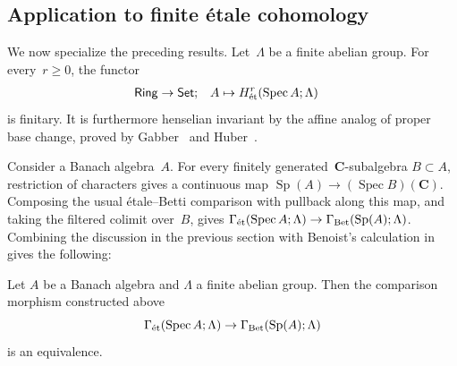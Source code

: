 \documentclass[11pt,a4paper]{amsart}
\numberwithin{equation}{section}
\theoremstyle{plain}
\theoremstyle{definition}
\theoremstyle{remark}
\newcommand{\CC}{\mathbf{C}}
\newcommand{\et}{\textnormal{ét}}
\newcommand{\Bet}{\textnormal{Bet}}
\newcommand{\Spec}{\operatorname{Spec}}
\newcommand{\Sp}{\operatorname{Sp}}
\newcommand{\Cat}[1]{\mathsf{#1}}
\begin{document}
\subsection{Application to finite étale cohomology}\label{ss:finite}

We now specialize the preceding results.
Let~\(\Lambda\) be a finite abelian group.
For every~\(r\geq0\), the functor
\begin{align*}
  \Cat{Ring}&\to\Cat{Set};&
  A&\mapsto H^r_{\et}(\Spec A;\Lambda)
\end{align*}
is finitary.
It is furthermore
henselian invariant by the affine analog of proper base change,
proved by Gabber~\cite{Gabber94} and Huber~\cite{Huber93}.

Consider a Banach algebra~\(A\).
For every finitely generated~\(\CC\)-subalgebra \(B\subset A\),
restriction of characters gives a continuous map
\(
  \Sp(A)\to(\Spec B)(\CC)
\).
Composing the usual étale--Betti comparison with pullback along this map,
and taking the filtered colimit over~\(B\), gives
\(
  \Gamma_{\et}(\Spec A;\Lambda)
  \to\Gamma_{\Bet}(\Sp(A);\Lambda)
\).
Combining the discussion in the previous section
with Benoist’s calculation in~\cite{Benoist25}
gives the following:

\begin{theorem}\label{xhppcz}
  Let \(A\) be a Banach algebra
  and \(\Lambda\) a finite abelian group.
  Then the comparison morphism
  constructed above
  \begin{equation*}
    \Gamma_{\et}(\Spec A;\Lambda)
    \to\Gamma_{\Bet}(\Sp(A);\Lambda)
  \end{equation*}
  is an equivalence.
\end{theorem}
\end{document}

